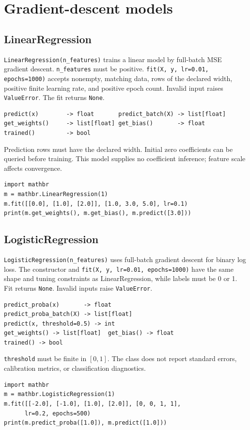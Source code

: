 \documentclass[11pt,a4paper]{article}
\begin{document}
\section{Gradient-descent models}
\subsection{LinearRegression}
\verb|LinearRegression(n_features)| trains a linear model by full-batch MSE gradient descent. \verb|n_features| must be positive. \verb|fit(X, y, lr=0.01, epochs=1000)| accepts nonempty, matching data, rows of the declared width, positive finite learning rate, and positive epoch count. Invalid input raises \verb|ValueError|. The fit returns \verb|None|.
\begin{verbatim}
predict(x)        -> float       predict_batch(X) -> list[float]
get_weights()     -> list[float] get_bias()       -> float
trained()         -> bool
\end{verbatim}
Prediction rows must have the declared width. Initial zero coefficients can be queried before training. This model supplies no coefficient inference; feature scale affects convergence.
\begin{verbatim}
import mathbr
m = mathbr.LinearRegression(1)
m.fit([[0.0], [1.0], [2.0]], [1.0, 3.0, 5.0], lr=0.1)
print(m.get_weights(), m.get_bias(), m.predict([3.0]))
\end{verbatim}

\subsection{LogisticRegression}
\verb|LogisticRegression(n_features)| uses full-batch gradient descent for binary log loss. The constructor and \verb|fit(X, y, lr=0.01, epochs=1000)| have the same shape and tuning constraints as LinearRegression, while labels must be 0 or 1. Fit returns \verb|None|. Invalid inputs raise \verb|ValueError|.
\begin{verbatim}
predict_proba(x)       -> float
predict_proba_batch(X) -> list[float]
predict(x, threshold=0.5) -> int
get_weights() -> list[float]  get_bias() -> float
trained() -> bool
\end{verbatim}
\verb|threshold| must be finite in $[0,1]$. The class does not report standard errors, calibration metrics, or classification diagnostics.
\begin{verbatim}
import mathbr
m = mathbr.LogisticRegression(1)
m.fit([[-2.0], [-1.0], [1.0], [2.0]], [0, 0, 1, 1],
      lr=0.2, epochs=500)
print(m.predict_proba([1.0]), m.predict([1.0]))
\end{verbatim}
\end{document}

